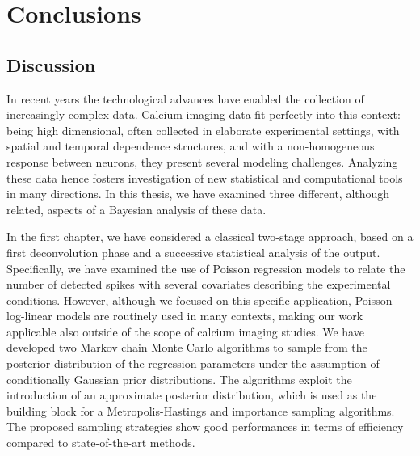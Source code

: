 \chapter*{Conclusions} %
\label{ch5}
\setlength{\parskip}{0.5pt}



\section*{Discussion}

In recent years the technological advances have enabled the collection of increasingly complex data. Calcium imaging data fit perfectly into this context: being high dimensional, often collected in elaborate experimental settings, with spatial and temporal dependence structures, and with a non-homogeneous response between neurons, they present several modeling challenges.
Analyzing these data hence fosters investigation of new statistical and computational tools in many directions.
In this thesis, we have examined three different, although related, aspects of a Bayesian analysis of these data.

In the first chapter, we have considered a classical two-stage approach, based on a first deconvolution phase and a successive statistical analysis of the output. Specifically, we have examined the use of Poisson regression models to relate the number of detected spikes with several covariates describing the experimental conditions. 
However, although we focused on this specific application, Poisson log-linear models are routinely used in many contexts, making our work applicable also outside of the scope of calcium imaging studies.
We have developed two Markov chain Monte Carlo algorithms to sample from the posterior distribution of the regression parameters under the assumption of conditionally Gaussian prior distributions.
The algorithms exploit the introduction of an approximate posterior distribution, which is used as the building block for a Metropolis-Hastings and importance sampling algorithms. 
The proposed sampling strategies show good performances in terms of efficiency compared to state-of-the-art methods.

